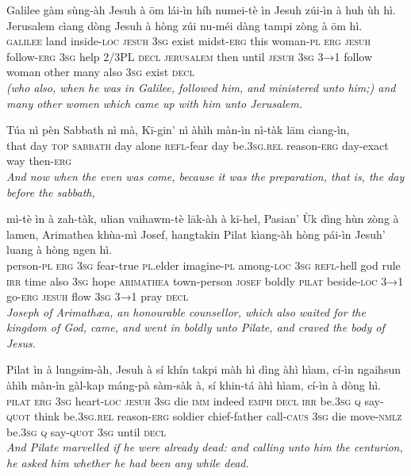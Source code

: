 \documentclass[11pt,a4paper]{article}
\begin{document}
\begin{exe}
\gll Galilee gàm sùng-àh Jesuh à ōm lái-ìn híh numei-tè ìn Jesuh zúi-ìn à huh ùh hì. Jerusalem cìang dòng Jesuh à hòng zúi nu-méi dàng tampi zòng à ōm hì. \\
     \textsc{galilee} land inside-\textsc{loc} \textsc{jesuh} \textsc{3sg} exist midst-\textsc{erg} this woman-\textsc{pl} \textsc{erg} \textsc{jesuh} follow-\textsc{erg} \textsc{3sg} help 2/3PL \textsc{decl} \textsc{jerusalem} then until \textsc{jesuh} \textsc{3sg} \textsc{3→1} follow woman other many also \textsc{3sg} exist \textsc{decl} \\
\glt \textcolor{kjvcolor}{\textit{(who also, when he was in Galilee, followed him, and ministered unto him;) and many other women which came up with him unto Jerusalem.}}

\gll Túa nì pèn Sabbath nì mà, Kī-gin' nì àhìh màn-ìn nì-tàk lām cìang-ìn, \\
     that day \textsc{top} \textsc{sabbath} day alone \textsc{refl}-fear day be.\textsc{3sg}.\textsc{rel} reason-\textsc{erg} day-exact way then-\textsc{erg} \\
\glt \textcolor{kjvcolor}{\textit{And now when the even was come, because it was the preparation, that is, the day before the sabbath,}}

\gll mì-tè ìn à zah-tàk, ulian vaihawm-tè lāk-àh à kī-hel, Pasian' Ùk dìng hùn zòng à lamen, Arimathea khùa-mì Josef, hangtakin Pilat kìang-àh hòng pái-ìn Jesuh' luang à hòng ngen hì. \\
     person-\textsc{pl} \textsc{erg} \textsc{3sg} fear-true \textsc{pl}.elder imagine-\textsc{pl} among-\textsc{loc} \textsc{3sg} \textsc{refl}-hell god rule \textsc{irr} time also \textsc{3sg} hope \textsc{arimathea} town-person \textsc{josef} boldly \textsc{pilat} beside-\textsc{loc} \textsc{3→1} go-\textsc{erg} \textsc{jesuh} flow \textsc{3sg} \textsc{3→1} pray \textsc{decl} \\
\glt \textcolor{kjvcolor}{\textit{Joseph of Arimathæa, an honourable counsellor, which also waited for the kingdom of God, came, and went in boldly unto Pilate, and craved the body of Jesus.}}

\gll Pilat ìn à lungsim-àh, Jesuh à sí khín takpi màh hì dìng àhì hìam, cí-ìn ngaihsun àhìh màn-ìn gàl-kap máng-pà sàm-sàk à, sí khin-tá àhì hìam, cí-ìn à dòng hì. \\
     \textsc{pilat} \textsc{erg} \textsc{3sg} heart-\textsc{loc} \textsc{jesuh} \textsc{3sg} die \textsc{imm} indeed \textsc{emph} \textsc{decl} \textsc{irr} be.\textsc{3sg} \textsc{q} say-\textsc{quot} think be.\textsc{3sg}.\textsc{rel} reason-\textsc{erg} soldier chief-father call-\textsc{caus} \textsc{3sg} die move-\textsc{nmlz} be.\textsc{3sg} \textsc{q} say-\textsc{quot} \textsc{3sg} until \textsc{decl} \\
\glt \textcolor{kjvcolor}{\textit{And Pilate marvelled if he were already dead: and calling unto him the centurion, he asked him whether he had been any while dead.}}


\end{exe}
\end{document}
